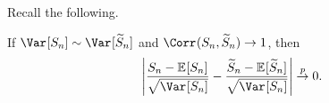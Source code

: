 Recall the following.

\begin{proposition}
	If \(\Var_{}[S_n]\sim \Var_{}[\widetilde{S} _n] \) and \(\Corr_{}(S_n, \widetilde{S} _n) \to 1\), then
	\[
		\left\vert \frac{S_n - \mathbb{E}_{}[S_n] }{\sqrt{\Var_{}[S_n] } } - \frac{\widetilde{S} _n - \mathbb{E}_{}[\widetilde{S} _n] }{\sqrt{\Var_{}[S_n] } } \right\vert
		\overset{p}{\to} 0.
	\]
\end{proposition}